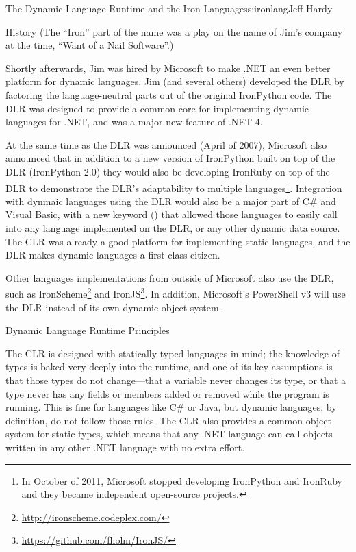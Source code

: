 \begin{aosachapter}{The Dynamic Language Runtime and the Iron Languages}{s:ironlang}{Jeff Hardy}
\begin{aosasect1}{History}
\noindent
(The ``Iron'' part of the name was a play on the name of Jim's company at the time, ``Want of a Nail Software''.)

Shortly afterwards, Jim was hired by Microsoft to make .NET an even better platform for dynamic languages. Jim (and several others) developed the DLR by factoring the language-neutral parts out of the original IronPython code. The DLR was designed to provide a common core for implementing dynamic languages for .NET, and was a major new feature of .NET 4.

At the same time as the DLR was announced (April of 2007), Microsoft also announced that in addition to a new version of IronPython built on top of the DLR (IronPython 2.0) they would also be developing IronRuby on top of the DLR to demonstrate the DLR's adaptability to multiple languages\footnote{In October of 2011, Microsoft stopped developing IronPython and IronRuby and they became independent open-source projects.}. Integration with dynmaic  languages using the DLR would also be a major part of C\# and Visual Basic, with a new keyword () that allowed those languages to easily call into any language implemented on the DLR, or any other dynamic data source. The CLR was already a good platform for implementing static languages, and the DLR makes dynamic languages a first-class citizen.

Other languages implementations from outside of Microsoft also use the DLR, such as IronScheme\footnote{\url{http://ironscheme.codeplex.com/}} and IronJS\footnote{\url{https://github.com/fholm/IronJS/}}. In addition, Microsoft's PowerShell v3 will use the DLR instead of its own dynamic object system.

\end{aosasect1}

\begin{aosasect1}{Dynamic Language Runtime Principles}

The CLR is designed with statically-typed languages in mind; the knowledge of types is baked very deeply into the runtime, and one of its key assumptions is that those types do not change---that a variable never changes its type, or that a type never has any fields or members added or removed while the program is running. This is fine for languages like C\# or Java, but dynamic languages, by definition, do not follow those rules. The CLR also provides a common object system for static types, which means that any .NET language can call objects written in any other .NET language with no extra effort.


\end{aosasect1}
\end{aosachapter}
